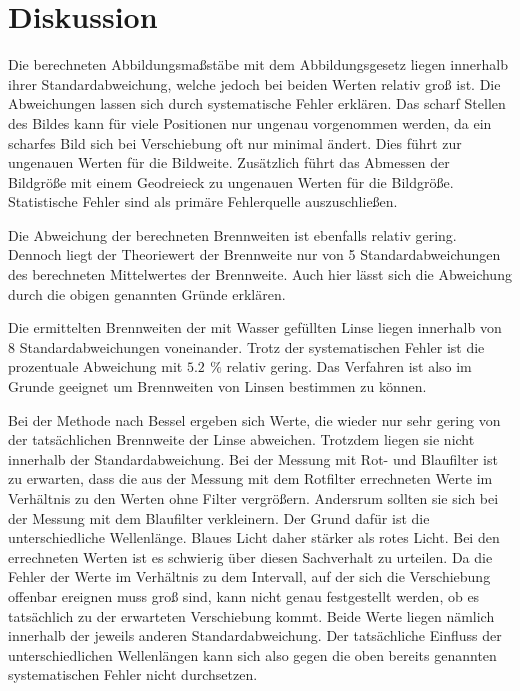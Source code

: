 \section{Diskussion}
\label{sec:Diskussion}
Die berechneten Abbildungsmaßstäbe mit dem Abbildungsgesetz liegen innerhalb ihrer Standardabweichung, welche
jedoch bei beiden Werten relativ groß ist. Die Abweichungen lassen sich durch systematische Fehler erklären.
Das scharf Stellen des Bildes kann für viele Positionen nur ungenau vorgenommen werden, da ein
scharfes Bild sich bei Verschiebung oft nur minimal ändert. Dies führt zur ungenauen Werten für die Bildweite.
Zusätzlich führt das Abmessen der Bildgröße mit einem Geodreieck zu ungenauen Werten für die Bildgröße.
Statistische Fehler sind als primäre Fehlerquelle auszuschließen.

Die Abweichung der berechneten Brennweiten ist ebenfalls relativ gering. Dennoch liegt der
Theoriewert der Brennweite nur von 5 Standardabweichungen des berechneten Mittelwertes der Brennweite. Auch hier lässt
sich die Abweichung durch die obigen genannten Gründe erklären.

Die ermittelten Brennweiten der mit Wasser gefüllten Linse liegen innerhalb von 8 Standardabweichungen voneinander.
Trotz der systematischen Fehler ist die prozentuale Abweichung mit $\SI{5.2}{} \, \%$ relativ gering. %
Das Verfahren ist also im Grunde geeignet um Brennweiten von Linsen bestimmen zu können.


Bei der Methode nach Bessel ergeben sich Werte, die wieder nur sehr gering von der tatsächlichen Brennweite der
Linse abweichen. Trotzdem liegen sie nicht innerhalb der Standardabweichung.
Bei der Messung mit Rot- und Blaufilter ist zu erwarten, dass die aus der Messung mit dem Rotfilter errechneten Werte
im Verhältnis zu den Werten ohne Filter vergrößern. Andersrum sollten sie sich bei der Messung mit dem Blaufilter verkleinern.
Der Grund dafür ist die unterschiedliche Wellenlänge. Blaues Licht daher stärker als rotes Licht. Bei den errechneten Werten
ist es schwierig über diesen Sachverhalt zu urteilen. Da die Fehler der Werte im Verhältnis zu dem Intervall, auf der sich
die Verschiebung offenbar ereignen muss groß sind, kann nicht genau festgestellt werden, ob es tatsächlich zu der erwarteten
Verschiebung kommt. Beide Werte liegen nämlich innerhalb der jeweils anderen Standardabweichung. Der tatsächliche Einfluss der unterschiedlichen Wellenlängen
kann sich also gegen die oben bereits genannten systematischen Fehler nicht durchsetzen.

